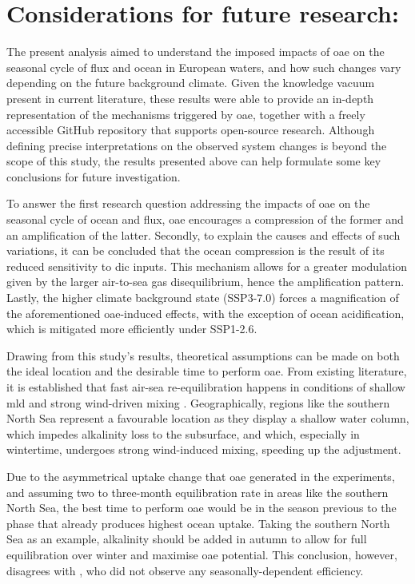 \chapter{Considerations for future research:}

The present analysis aimed to understand the imposed impacts of \ac{oae} on the seasonal cycle of  flux and ocean  in European waters, and how such changes vary depending on the future background climate. Given the knowledge vacuum present in current literature, these results were able to provide an in-depth representation of the mechanisms triggered by \ac{oae}, together with a freely accessible GitHub repository that supports open-source research. Although defining precise interpretations on the observed system changes is beyond the scope of this study, the results presented above can help formulate some key conclusions for future investigation. 

To answer the first research question addressing the impacts of \ac{oae} on the seasonal cycle of ocean  and  flux, \ac{oae} encourages a compression of the former and an amplification of the latter. Secondly, to explain the causes and effects of such variations, it can be concluded that the ocean  compression is the result of its reduced sensitivity to \ac{dic} inputs. This mechanism allows for a greater  modulation given by the larger air-to-sea gas disequilibrium, hence the  amplification pattern. Lastly, the higher climate background state (SSP3-7.0) forces a magnification of the aforementioned \ac{oae}-induced effects, with the exception of ocean acidification, which is mitigated more efficiently under SSP1-2.6. 

Drawing from this study's results, theoretical assumptions can be made on both the ideal location and the desirable time to perform \ac{oae}. From existing literature, it is established that fast air-sea re-equilibration happens in conditions of shallow \ac{mld} and strong wind-driven mixing \citep{jones2014spatial}. Geographically, regions like the southern North Sea represent a favourable location as they display a shallow water column, which impedes alkalinity loss to the subsurface, and which, especially in wintertime, undergoes strong wind-induced mixing, speeding up the adjustment.

Due to the asymmetrical uptake change that \ac{oae} generated in the experiments, and assuming two to three-month equilibration rate in areas like the southern North Sea, the best time to perform \ac{oae} would be in the season previous to the phase that already produces highest ocean  uptake. Taking the southern North Sea as an example, alkalinity should be added in autumn to allow for full equilibration over winter and maximise \ac{oae} potential. This conclusion, however, disagrees with \cite{lenton2018assessing}, who did not observe any seasonally-dependent efficiency. 

